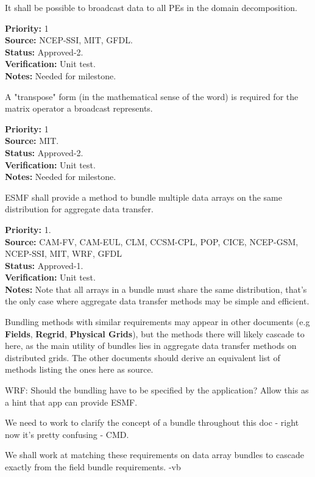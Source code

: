 It shall be possible to broadcast data to all PEs in the domain decomposition.

\begin{reqlist}
{\bf Priority:} 1 \\ 
{\bf Source:} NCEP-SSI, MIT, GFDL. \\
{\bf Status:} Approved-2. \\
{\bf Verification:} Unit test. \\
{\bf Notes:} Needed for milestone.
\end{reqlist}

A "transpose" form (in the mathematical sense of the word) is required
for the matrix operator a broadcast represents.
\begin{reqlist}
{\bf Priority:} 1 \\ 
{\bf Source:}  MIT. \\
{\bf Status:} Approved-2. \\
{\bf Verification:} Unit test. \\
{\bf Notes:} Needed for milestone.
\end{reqlist}


ESMF shall provide a method to bundle multiple data arrays on the same
distribution for aggregate data transfer.

\begin{reqlist}
{\bf Priority:} 1. \\ 
{\bf Source:} CAM-FV, CAM-EUL, CLM, CCSM-CPL, POP, CICE, NCEP-GSM, NCEP-SSI, MIT, WRF, GFDL \\
{\bf Status:} Approved-1. \\
{\bf Verification:} Unit test. \\
{\bf Notes:} Note that all arrays in a bundle must share the same
  distribution, that's the only case where aggregate data transfer
  methods may be simple and efficient.
  
  Bundling methods with similar requirements may appear in other
  documents (e.g \textbf{Fields}, \textbf{Regrid}, \textbf{Physical Grids}),
  but the methods there will likely cascade to here, as the main
  utility of bundles lies in aggregate data transfer methods on
  distributed grids. The other documents should derive an equivalent
  list of methods listing the ones here as source.

WRF: Should the bundling have to be specified by the application?  Allow this as a hint that app can provide ESMF.

We need to work to clarify the concept of a bundle throughout this doc -
right now it's pretty confusing - CMD.

We shall work at matching these requirements on data array bundles to
cascade exactly from the field bundle requirements. -vb
\end{reqlist}

